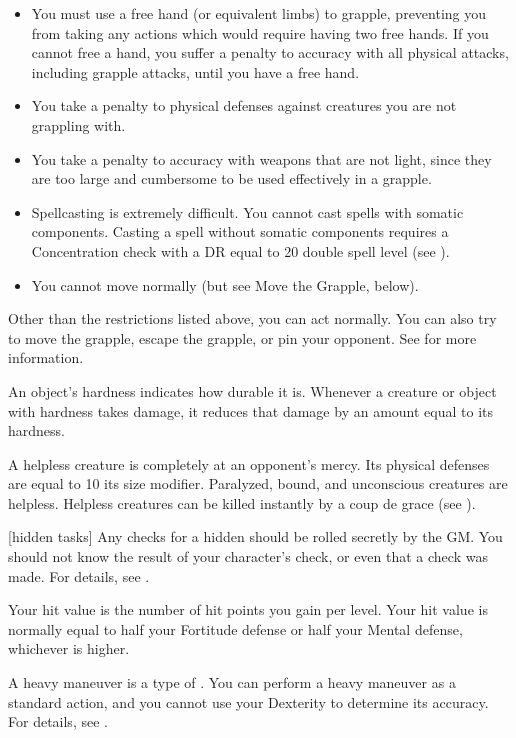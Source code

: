 \begin{itemize}
    \item You must use a free hand (or equivalent limbs) to grapple, preventing you from taking any actions which would require having two free hands. If you cannot free a hand, you suffer a  penalty to accuracy with all physical attacks, including grapple attacks, until you have a free hand.
    \item You take a  penalty to physical defenses against creatures you are not grappling with.
    \item You take a  penalty to accuracy with weapons that are not light, since they are too large and cumbersome to be used effectively in a grapple.
    \item Spellcasting is extremely difficult. You cannot cast spells with somatic components. Casting a spell without somatic components requires a Concentration check with a DR equal to 20 \add double spell level (see ).
    \item You cannot move normally (but see Move the Grapple, below).
\end{itemize}

Other than the restrictions listed above, you can act normally. You can also try to move the grapple, escape the grapple, or pin your opponent. See  for more information.

 An object's hardness indicates how durable it is.
Whenever a creature or object with hardness takes damage, it reduces that damage by an amount equal to its hardness.

 A helpless creature is completely at an opponent's mercy. Its physical defenses are equal to 10 \add its size modifier. Paralyzed, bound, and unconscious creatures are helpless. Helpless creatures can be killed instantly by a coup de grace (see ).

[hidden tasks] Any checks for a hidden  should be rolled secretly by the GM.\@
You should not know the result of your character's check, or even that a check was made.
For details, see .

 Your hit value is the number of hit points you gain per level.
Your hit value is normally equal to half your Fortitude defense or half your Mental defense, whichever is higher.

 A heavy maneuver is a type of .
You can perform a heavy maneuver as a standard action, and you cannot use your Dexterity to determine its accuracy.
For details, see .

